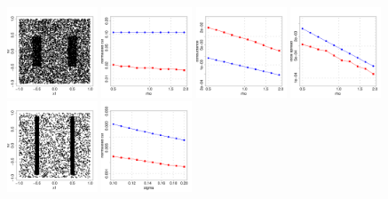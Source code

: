 \documentclass[11pt,twoside]{article}
\newcommand{\1}{\mathbf{1}}
\begin{document}
\begin{figure}[htb]
	\centering
	\includegraphics[width=0.24\textwidth]{plots/experiment_1/rho/samples5.pdf}
	\includegraphics[width=0.24\textwidth]{plots/experiment_1/rho/normalized_cut.pdf}
	\includegraphics[width=0.24\textwidth]{plots/experiment_1/rho/conductance.pdf}
	\includegraphics[width=0.24\textwidth]{plots/experiment_1/rho/local_spread.pdf}
	\includegraphics[width=0.24\textwidth]{plots/experiment_1/sigma/samples1.pdf}
	\includegraphics[width=0.24\textwidth]{plots/experiment_1/sigma/normalized_cut.pdf}

\end{figure}
\end{document}
